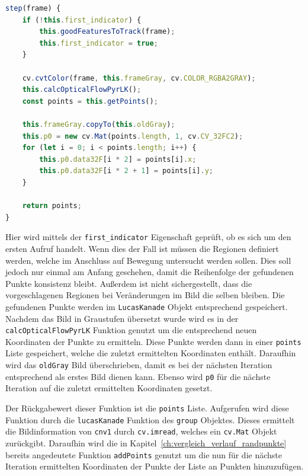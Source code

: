 \begin{lstlisting}[language=JavaScript, caption={Implementation der \lstinline{step} Funktion der \lstinline{LucasKanade} Klasse}, label={lst:LucasKanade_step}]
step(frame) {
    if (!this.first_indicator) {
        this.goodFeaturesToTrack(frame);
        this.first_indicator = true;
    }

    cv.cvtColor(frame, this.frameGray, cv.COLOR_RGBA2GRAY);
    this.calcOpticalFlowPyrLK();
    const points = this.getPoints();

    this.frameGray.copyTo(this.oldGray);
    this.p0 = new cv.Mat(points.length, 1, cv.CV_32FC2);
    for (let i = 0; i < points.length; i++) {
        this.p0.data32F[i * 2] = points[i].x;
        this.p0.data32F[i * 2 + 1] = points[i].y;
    }

    return points;
}
\end{lstlisting}

Hier wird mittels der \lstinline{first_indicator} Eigenschaft geprüft, ob es sich um den ersten Aufruf handelt.
Wenn dies der Fall ist müssen die Regionen definiert werden, welche im Anschluss auf Bewegung untersucht werden sollen.
Dies soll jedoch nur einmal am Anfang geschehen, damit die Reihenfolge der gefundenen Punkte konsistenz bleibt.
Au{\ss}erdem ist nicht sichergestellt, dass die vorgeschlagenen Regionen bei Veränderungen im Bild die selben bleiben.
Die gefundenen Punkte werden im \lstinline{LucasKanade} Objekt entsprechend gespeichert.
Nachdem das Bild in Graustufen übersetzt wurde wird es in der \lstinline{calcOpticalFlowPyrLK} Funktion genutzt um die entsprechend neuen Koordinaten der Punkte zu ermitteln.
Diese Punkte werden dann in einer \lstinline{points} Liste gespeichert, welche die zuletzt ermittelten Koordinaten enthält.
Daraufhin wird das \lstinline{oldGray} Bild überschrieben, damit es bei der nächsten Iteration entsprechend als erstes Bild dienen kann.
Ebenso wird \lstinline{p0} für die nächste Iteration auf die zuletzt ermittelten Koordinaten gesetzt.

Der Rückgabewert dieser Funktion ist die \lstinline{points} Liste.
Aufgerufen wird diese Funktion durch die \lstinline{lucasKanade} Funktion des \lstinline{group} Objektes.
Dieses ermittelt die Bildinformation von \lstinline{cnv1} durch \lstinline{cv.imread}, welches ein \lstinline{cv.Mat} Objekt zurückgibt.
Daraufhin wird die in Kapitel~\ref{ch:vergleich_verlauf_randpunkte} bereits angedeutete Funktion \lstinline{addPoints} genutzt um die nun für die nächste Iteration ermittelten Koordinaten der Punkte der Liste an Punkten hinzuzufügen.

